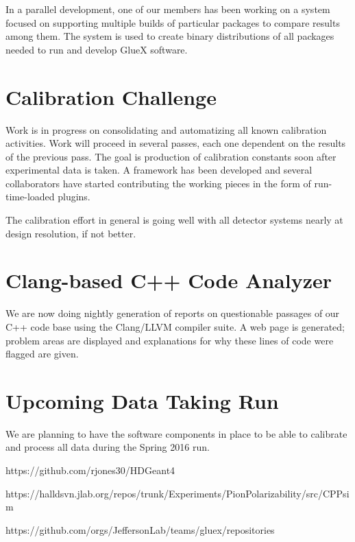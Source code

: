\documentclass[12pt]{article}
\begin{document}
In a parallel development, one of our members has been working on a
system focused on supporting multiple builds of particular packages to
compare results among them. The system is used to create binary
distributions of all packages needed to run and develop GlueX
software.

\section{Calibration Challenge}

Work is in progress on consolidating and automatizing all known
calibration activities. Work will proceed in several passes, each one
dependent on the results of the previous pass. The goal is production
of calibration constants soon after experimental data is taken. A
framework has been developed and several collaborators have started
contributing the working pieces in the form of run-time-loaded plugins.

The calibration effort in general is going well with all detector
systems nearly at design resolution, if not better.

\section{Clang-based C++ Code Analyzer}

We are now doing nightly generation of reports on questionable passages
of our C++ code base using the Clang/LLVM compiler suite. A web page
is generated; problem areas are displayed and explanations
for why these lines of code were flagged are given.

\section{Upcoming Data Taking Run}

We are planning to have the software components in place to be able to
calibrate and process all data during the Spring 2016 run.

\begin{thebibliography}{9}

 https://github.com/rjones30/HDGeant4

  https://halldsvn.jlab.org/repos/trunk/Experiments/PionPolarizability/src/CPPsim

  https://github.com/orgs/JeffersonLab/teams/gluex/repositories

\end{thebibliography}
\end{document}

